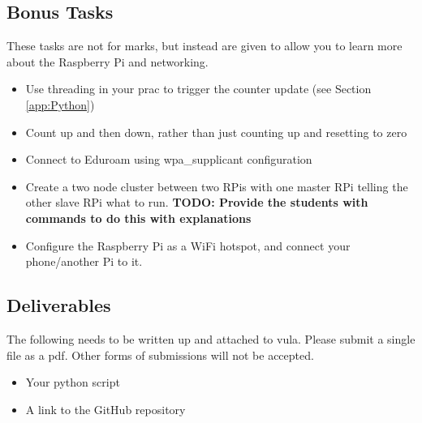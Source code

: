 \subsection{Bonus Tasks}
These tasks are not for marks, but instead are given to allow you to learn more about the Raspberry Pi and networking. 
\begin{itemize}
    \item Use threading in your prac to trigger the counter update (see Section \ref{app:Python})
    \item Count up and then down, rather than just counting up and resetting to zero
    \item Connect to Eduroam using wpa\_supplicant configuration
    \item Create a two node cluster between two RPis with one master RPi telling the other slave RPi what to run. \textbf{TODO: Provide the students with commands to do this with explanations} 
    \item Configure the Raspberry Pi as a WiFi hotspot, and connect your phone/another Pi to it.
\end{itemize}

\subsection{Deliverables}
The following needs to be written up and attached to vula. Please submit a single file as a pdf. Other forms of submissions will not be accepted.
\begin{itemize}
    \item Your python script
    \item A link to the GitHub repository
\end{itemize}
